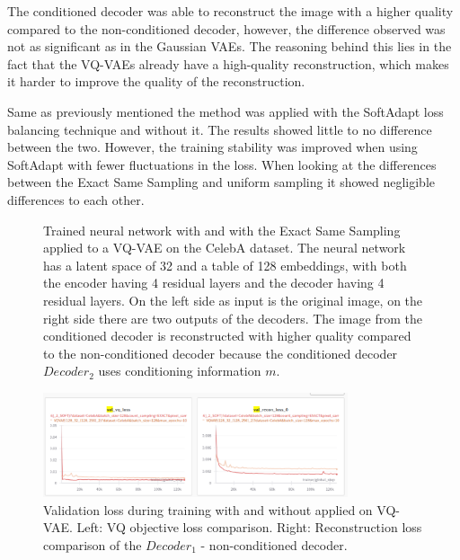 The conditioned decoder was able to reconstruct the image with a higher quality compared to the non-conditioned decoder, however, the difference observed was not as significant as in the Gaussian VAEs. The reasoning behind this lies in the fact that the VQ-VAEs already have a high-quality reconstruction, which makes it harder to improve the quality of the reconstruction.

Same as previously mentioned the method was applied with the SoftAdapt loss balancing technique and without it. The results showed little to no difference between the two. However, the training stability was improved when using SoftAdapt with fewer fluctuations in the loss. When looking at the differences between the Exact Same Sampling and uniform sampling it showed negligible differences to each other. 


\begin{figure}[H]
    \centering
    
    \caption[Trained neural network with  applied to a VQ-VAE.]
    {
        Trained neural network with  and with the Exact Same Sampling applied to a VQ-VAE on the CelebA dataset. The neural network has a latent space of 32 and a table of 128 embeddings, with both the encoder having 4 residual layers and the decoder having 4 residual layers.
        On the left side as input is the original image, on the right side there are two outputs of the decoders. 
        The image from the conditioned decoder is reconstructed with higher quality compared to the non-conditioned decoder because the conditioned decoder $Decoder_2$ uses conditioning information $m$.
    }
    \label{fig:res_val_vqvae}
\end{figure}

\begin{figure}[H]
    \centering
    \includegraphics[width=0.8\textwidth]{figures/results/VQ+RECON.png}
    \caption[Validation loss comparison during training of a Gaussian VAE.]
    {
        Validation loss during training with and without  applied on VQ-VAE.
        Left: VQ objective loss comparison. Right: Reconstruction loss comparison of the $Decoder_1$ - non-conditioned decoder.
    }
    \label{fig:results_method1_vq_vae}
\end{figure}

